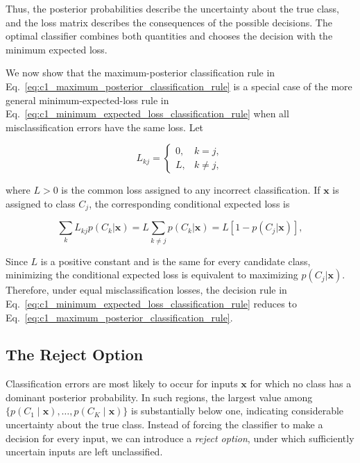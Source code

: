 \documentclass[10pt,twocolumn]{memoir}
\begin{document}
Thus, the posterior probabilities describe the uncertainty about the true class, and the loss matrix describes the consequences of the possible decisions. The optimal classifier combines both quantities and chooses the decision with the minimum expected loss.

We now show that the maximum-posterior classification rule in Eq.~\ref{eq:c1_maximum_posterior_classification_rule} is a special case of the more general minimum-expected-loss rule in Eq.~\ref{eq:c1_minimum_expected_loss_classification_rule} when all misclassification errors have the same loss. Let

\begin{equation}
    L_{kj} =
    \begin{cases}
        0, & k=j,\\
        L, & k\neq j,
    \end{cases}
\end{equation}

where $L>0$ is the common loss assigned to any incorrect classification. If $\mathbf{x}$ is assigned to class $C_j$, the corresponding conditional expected loss is

\begin{equation}
    \sum_k L_{kj}p(C_k|\mathbf{x}) = L\sum_{k\neq j}p(C_k|\mathbf{x}) = L\left[1-p(C_j|\mathbf{x})\right],
\end{equation}

Since $L$ is a positive constant and is the same for every candidate class, minimizing the conditional expected loss is equivalent to maximizing $p(C_j|\mathbf{x})$. Therefore, under equal misclassification losses, the decision rule in Eq.~\ref{eq:c1_minimum_expected_loss_classification_rule} reduces to Eq.~\ref{eq:c1_maximum_posterior_classification_rule}.

\subsection{The Reject Option}

Classification errors are most likely to occur for inputs $\mathbf{x}$ for which no class has a dominant posterior probability. In such regions, the largest value among $\{p(C_1\mid\mathbf{x}),\ldots,p(C_K\mid\mathbf{x})\}$ is substantially below one, indicating considerable uncertainty about the true class. Instead of forcing the classifier to make a decision for every input, we can introduce a \textit{reject option}, under which sufficiently uncertain inputs are left unclassified.
\end{document}

